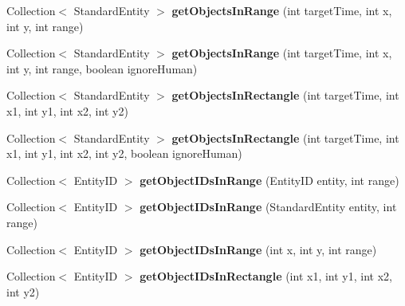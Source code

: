 \begin{DoxyCompactItemize}
Collection$<$ Standard\+Entity $>$ {\bfseries get\+Objects\+In\+Range} (int target\+Time, int x, int y, int range)
\item 
\hypertarget{classadf_1_1agent_1_1info_1_1WorldInfo_a43594cb2f1ba5bf5874ce5dea13a0ea1}{}\label{classadf_1_1agent_1_1info_1_1WorldInfo_a43594cb2f1ba5bf5874ce5dea13a0ea1} 
Collection$<$ Standard\+Entity $>$ {\bfseries get\+Objects\+In\+Range} (int target\+Time, int x, int y, int range, boolean ignore\+Human)
\item 
\hypertarget{classadf_1_1agent_1_1info_1_1WorldInfo_a465684265852e92b37857fc0991d655f}{}\label{classadf_1_1agent_1_1info_1_1WorldInfo_a465684265852e92b37857fc0991d655f} 
Collection$<$ Standard\+Entity $>$ {\bfseries get\+Objects\+In\+Rectangle} (int target\+Time, int x1, int y1, int x2, int y2)
\item 
\hypertarget{classadf_1_1agent_1_1info_1_1WorldInfo_a0c323103d99a5cc5e98915f2ba2ee52b}{}\label{classadf_1_1agent_1_1info_1_1WorldInfo_a0c323103d99a5cc5e98915f2ba2ee52b} 
Collection$<$ Standard\+Entity $>$ {\bfseries get\+Objects\+In\+Rectangle} (int target\+Time, int x1, int y1, int x2, int y2, boolean ignore\+Human)
\item 
\hypertarget{classadf_1_1agent_1_1info_1_1WorldInfo_aeef92b3a1551a7f1b65e7605e2e3d9af}{}\label{classadf_1_1agent_1_1info_1_1WorldInfo_aeef92b3a1551a7f1b65e7605e2e3d9af} 
Collection$<$ Entity\+ID $>$ {\bfseries get\+Object\+I\+Ds\+In\+Range} (Entity\+ID entity, int range)
\item 
\hypertarget{classadf_1_1agent_1_1info_1_1WorldInfo_aef74baa1230c0898f89be9ca3aa4adbe}{}\label{classadf_1_1agent_1_1info_1_1WorldInfo_aef74baa1230c0898f89be9ca3aa4adbe} 
Collection$<$ Entity\+ID $>$ {\bfseries get\+Object\+I\+Ds\+In\+Range} (Standard\+Entity entity, int range)
\item 
\hypertarget{classadf_1_1agent_1_1info_1_1WorldInfo_a8919105735facc4289ef28cae1e53e28}{}\label{classadf_1_1agent_1_1info_1_1WorldInfo_a8919105735facc4289ef28cae1e53e28} 
Collection$<$ Entity\+ID $>$ {\bfseries get\+Object\+I\+Ds\+In\+Range} (int x, int y, int range)
\item 
\hypertarget{classadf_1_1agent_1_1info_1_1WorldInfo_aecd511e14f6e286b134e370d56967d37}{}\label{classadf_1_1agent_1_1info_1_1WorldInfo_aecd511e14f6e286b134e370d56967d37} 
Collection$<$ Entity\+ID $>$ {\bfseries get\+Object\+I\+Ds\+In\+Rectangle} (int x1, int y1, int x2, int y2)
\item 
\hypertarget{classadf_1_1agent_1_1info_1_1WorldInfo_a1520935e7f70d951c62415fb8fa26e83}{}\label{classadf_1_1agent_1_1info_1_1WorldInfo_a1520935e7f70d951c62415fb8fa26e83} 

\end{DoxyCompactItemize}
